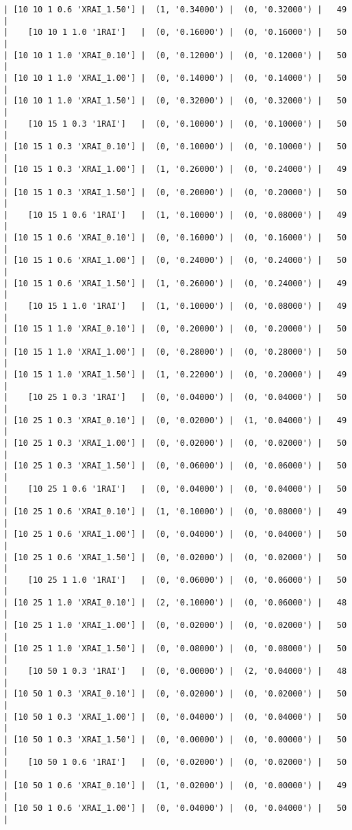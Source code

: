 \documentclass{article}
\begin{document}
\begin{verbatim}
| [10 10 1 0.6 'XRAI_1.50'] |  (1, '0.34000') |  (0, '0.32000') |   49  |
|    [10 10 1 1.0 '1RAI']   |  (0, '0.16000') |  (0, '0.16000') |   50  |
| [10 10 1 1.0 'XRAI_0.10'] |  (0, '0.12000') |  (0, '0.12000') |   50  |
| [10 10 1 1.0 'XRAI_1.00'] |  (0, '0.14000') |  (0, '0.14000') |   50  |
| [10 10 1 1.0 'XRAI_1.50'] |  (0, '0.32000') |  (0, '0.32000') |   50  |
|    [10 15 1 0.3 '1RAI']   |  (0, '0.10000') |  (0, '0.10000') |   50  |
| [10 15 1 0.3 'XRAI_0.10'] |  (0, '0.10000') |  (0, '0.10000') |   50  |
| [10 15 1 0.3 'XRAI_1.00'] |  (1, '0.26000') |  (0, '0.24000') |   49  |
| [10 15 1 0.3 'XRAI_1.50'] |  (0, '0.20000') |  (0, '0.20000') |   50  |
|    [10 15 1 0.6 '1RAI']   |  (1, '0.10000') |  (0, '0.08000') |   49  |
| [10 15 1 0.6 'XRAI_0.10'] |  (0, '0.16000') |  (0, '0.16000') |   50  |
| [10 15 1 0.6 'XRAI_1.00'] |  (0, '0.24000') |  (0, '0.24000') |   50  |
| [10 15 1 0.6 'XRAI_1.50'] |  (1, '0.26000') |  (0, '0.24000') |   49  |
|    [10 15 1 1.0 '1RAI']   |  (1, '0.10000') |  (0, '0.08000') |   49  |
| [10 15 1 1.0 'XRAI_0.10'] |  (0, '0.20000') |  (0, '0.20000') |   50  |
| [10 15 1 1.0 'XRAI_1.00'] |  (0, '0.28000') |  (0, '0.28000') |   50  |
| [10 15 1 1.0 'XRAI_1.50'] |  (1, '0.22000') |  (0, '0.20000') |   49  |
|    [10 25 1 0.3 '1RAI']   |  (0, '0.04000') |  (0, '0.04000') |   50  |
| [10 25 1 0.3 'XRAI_0.10'] |  (0, '0.02000') |  (1, '0.04000') |   49  |
| [10 25 1 0.3 'XRAI_1.00'] |  (0, '0.02000') |  (0, '0.02000') |   50  |
| [10 25 1 0.3 'XRAI_1.50'] |  (0, '0.06000') |  (0, '0.06000') |   50  |
|    [10 25 1 0.6 '1RAI']   |  (0, '0.04000') |  (0, '0.04000') |   50  |
| [10 25 1 0.6 'XRAI_0.10'] |  (1, '0.10000') |  (0, '0.08000') |   49  |
| [10 25 1 0.6 'XRAI_1.00'] |  (0, '0.04000') |  (0, '0.04000') |   50  |
| [10 25 1 0.6 'XRAI_1.50'] |  (0, '0.02000') |  (0, '0.02000') |   50  |
|    [10 25 1 1.0 '1RAI']   |  (0, '0.06000') |  (0, '0.06000') |   50  |
| [10 25 1 1.0 'XRAI_0.10'] |  (2, '0.10000') |  (0, '0.06000') |   48  |
| [10 25 1 1.0 'XRAI_1.00'] |  (0, '0.02000') |  (0, '0.02000') |   50  |
| [10 25 1 1.0 'XRAI_1.50'] |  (0, '0.08000') |  (0, '0.08000') |   50  |
|    [10 50 1 0.3 '1RAI']   |  (0, '0.00000') |  (2, '0.04000') |   48  |
| [10 50 1 0.3 'XRAI_0.10'] |  (0, '0.02000') |  (0, '0.02000') |   50  |
| [10 50 1 0.3 'XRAI_1.00'] |  (0, '0.04000') |  (0, '0.04000') |   50  |
| [10 50 1 0.3 'XRAI_1.50'] |  (0, '0.00000') |  (0, '0.00000') |   50  |
|    [10 50 1 0.6 '1RAI']   |  (0, '0.02000') |  (0, '0.02000') |   50  |
| [10 50 1 0.6 'XRAI_0.10'] |  (1, '0.02000') |  (0, '0.00000') |   49  |
| [10 50 1 0.6 'XRAI_1.00'] |  (0, '0.04000') |  (0, '0.04000') |   50  |

\end{verbatim}
\end{document}
